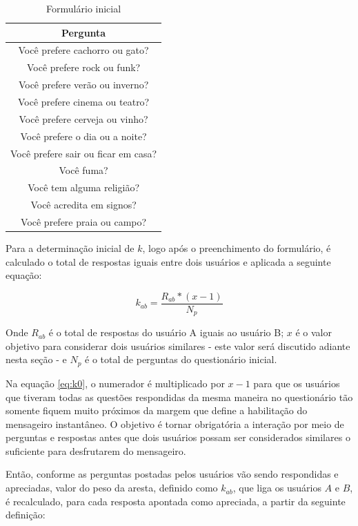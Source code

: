 \begin{table}[!htp]
\centering
\caption{Formulário inicial}
\label{tab:questoes}
\begin{tabular}{ || c ||}
\hline
Pergunta\\
\hline
\hline
Você prefere cachorro ou gato?\\  
\hline
Você prefere rock ou funk?\\
\hline
Você prefere verão ou inverno? \\
\hline
Você prefere cinema ou teatro?\\
\hline
Você prefere cerveja ou vinho?\\
\hline
Você prefere o dia ou a noite?\\
\hline
Você prefere sair ou ficar em casa?\\
\hline
Você fuma?\\
\hline
Você tem alguma religião?\\
\hline
Você acredita em signos?\\
\hline
Você prefere praia ou campo?\\
\hline
\end{tabular}
\end{table}

Para a determinação inicial de $k$, logo após o preenchimento do formulário, é calculado o total de respostas iguais entre dois usuários e aplicada a seguinte equação:

\begin{equation}
k_{ab} = \frac{R_{ab}*(x-1)}{N_{p}}
 \label{eq:k0}
\end{equation}


Onde $R_{ab}$ é o total de respostas do usuário A iguais ao usuário B; $x$ é o valor objetivo para considerar dois usuários similares - este valor será discutido adiante nesta seção - e $N_{p}$ é o total de perguntas do questionário inicial.

Na equação \ref{eq:k0}, o numerador é multiplicado por $x-1$ para que os usuários que tiveram todas as questões respondidas da mesma maneira no questionário tão somente fiquem muito próximos da margem que define a habilitação do mensageiro instantâneo. O objetivo é tornar obrigatória a interação por meio de perguntas e respostas antes que dois usuários possam ser considerados similares o suficiente para desfrutarem do mensageiro.

Então, conforme as perguntas postadas pelos usuários vão sendo respondidas e apreciadas, valor do peso da aresta, definido como $k_{ab}$, que liga os usuários $A$ e $B$, é recalculado, para cada resposta apontada como apreciada, a partir da seguinte definição:

